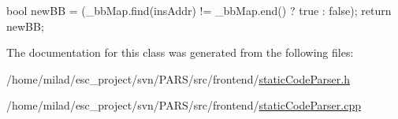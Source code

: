\begin{DoxyCode}
                                              {
        bool newBB = (_bbMap.find(insAddr) != _bbMap.end() ? true : false);
        return newBB;
}
\end{DoxyCode}


The documentation for this class was generated from the following files:\begin{DoxyCompactItemize}
\item 
/home/milad/esc\_\-project/svn/PARS/src/frontend/\hyperlink{staticCodeParser_8h}{staticCodeParser.h}\item 
/home/milad/esc\_\-project/svn/PARS/src/frontend/\hyperlink{staticCodeParser_8cpp}{staticCodeParser.cpp}\end{DoxyCompactItemize}
